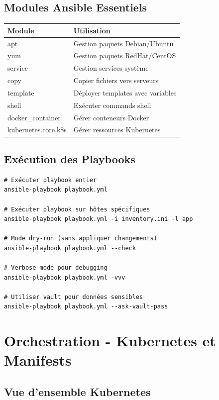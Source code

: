 \documentclass[12pt,a4paper]{report}
\begin{document}
\section{Modules Ansible Essentiels}

\begin{table}[H]
\centering
\begin{tabularx}{\linewidth}{|l|X|}
\hline
\textbf{Module} & \textbf{Utilisation} \\
\hline
apt & Gestion paquets Debian/Ubuntu \\
yum & Gestion paquets RedHat/CentOS \\
service & Gestion services système \\
copy & Copier fichiers vers serveurs \\
template & Déployer templates avec variables \\
shell & Exécuter commands shell \\
docker\_container & Gérer conteneurs Docker \\
kubernetes.core.k8s & Gérer ressources Kubernetes \\
\hline
\end{tabularx}
\end{table}

\section{Exécution des Playbooks}

\begin{lstlisting}
# Exécuter playbook entier
ansible-playbook playbook.yml

# Exécuter playbook sur hôtes spécifiques
ansible-playbook playbook.yml -i inventory.ini -l app

# Mode dry-run (sans appliquer changements)
ansible-playbook playbook.yml --check

# Verbose mode pour debugging
ansible-playbook playbook.yml -vvv

# Utiliser vault pour données sensibles
ansible-playbook playbook.yml --ask-vault-pass
\end{lstlisting}

\newpage

\chapter{Orchestration - Kubernetes et Manifests}

\section{Vue d'ensemble Kubernetes}
\end{document}
